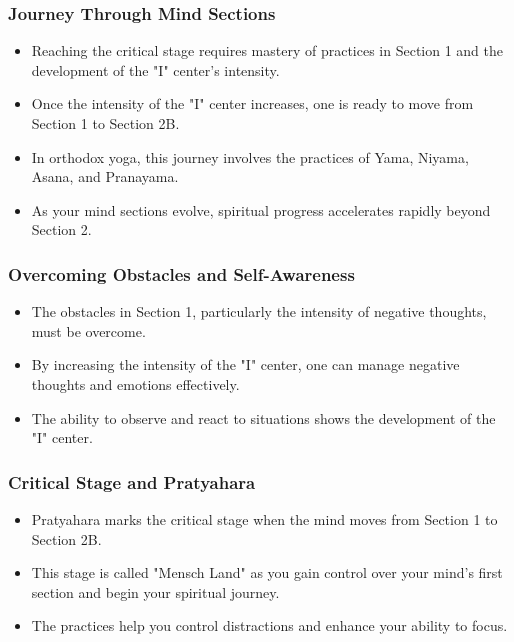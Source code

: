 \begin{frame}[fragile]\frametitle{Journey Through Mind Sections}
    \begin{itemize}
        \item Reaching the critical stage requires mastery of practices in Section 1 and the development of the "I" center's intensity.
        \item Once the intensity of the "I" center increases, one is ready to move from Section 1 to Section 2B.
        \item In orthodox yoga, this journey involves the practices of Yama, Niyama, Asana, and Pranayama.
        \item As your mind sections evolve, spiritual progress accelerates rapidly beyond Section 2.
    \end{itemize}
\end{frame}

\begin{frame}[fragile]\frametitle{Overcoming Obstacles and Self-Awareness}
    \begin{itemize}
        \item The obstacles in Section 1, particularly the intensity of negative thoughts, must be overcome.
        \item By increasing the intensity of the "I" center, one can manage negative thoughts and emotions effectively.
        \item The ability to observe and react to situations shows the development of the "I" center.
    \end{itemize}
\end{frame}

\begin{frame}[fragile]\frametitle{Critical Stage and Pratyahara}
    \begin{itemize}
        \item Pratyahara marks the critical stage when the mind moves from Section 1 to Section 2B.
        \item This stage is called "Mensch Land" as you gain control over your mind's first section and begin your spiritual journey.
        \item The practices help you control distractions and enhance your ability to focus.
    \end{itemize}
\end{frame}

